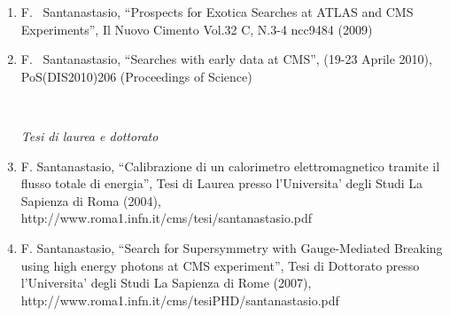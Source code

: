 \documentclass[10pt]{letter}
\begin{document}
\begin{enumerate}
\item F. ~Santanastasio, ``Prospects for Exotica Searches at ATLAS and CMS Experiments'', 
  Il Nuovo Cimento Vol.32 C, N.3-4 ncc9484 (2009)

\item F. ~Santanastasio, ``Searches with early data at CMS'', 
(19-23 Aprile 2010), PoS(DIS2010)206 (Proceedings of Science)


~\\
\begin{center} \textit{Tesi di laurea e dottorato} \\  \end{center}

\item F. Santanastasio, ``Calibrazione di un calorimetro elettromagnetico tramite il flusso totale di energia'', Tesi di Laurea presso l'Universita' degli Studi La Sapienza di Roma (2004), \\ http://www.roma1.infn.it/cms/tesi/santanastasio.pdf 

\item F. Santanastasio, ``Search for Supersymmetry with Gauge-Mediated Breaking using high energy photons at CMS experiment'', Tesi di Dottorato presso l'Universita' degli Studi La Sapienza di Rome (2007),\\ http://www.roma1.infn.it/cms/tesiPHD/santanastasio.pdf 

\end{enumerate}
\end{document}
